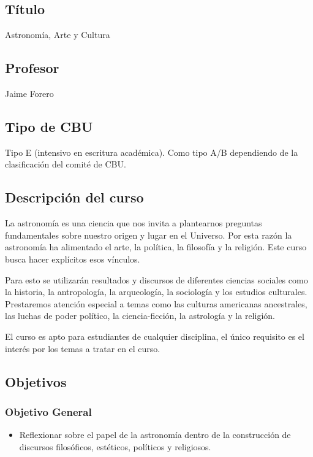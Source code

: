 \documentclass[12pt]{report}
\begin{document}
\subsection*{\bf T\'itulo}
Astronom\'ia, Arte y Cultura\\

\subsection*{\bf Profesor}
Jaime Forero\\

\subsection*{Tipo de CBU}
Tipo E (intensivo en escritura acad\'emica). 
Como tipo A/B dependiendo de la clasificaci\'on del comit\'e de CBU.  

\subsection*{Descripci\'on del curso}
La astronom\'ia es una ciencia que nos invita a plantearnos preguntas
fundamentales sobre nuestro origen y lugar en el Universo. 
Por esta raz\'on la astronom\'ia ha alimentado el
arte, la pol\'itica, la filosof\'ia y la religi\'on. Este curso busca
hacer expl\'icitos esos v\'inculos.

Para esto se utilizar\'an resultados y discursos de diferentes
ciencias sociales como la historia, la antropolog\'ia, la arqueolog\'ia, la
sociolog\'ia y los estudios culturales. Prestaremos atenci\'on
especial a temas como las culturas americanas  ancestrales, las luchas
de poder pol\'itico, la ciencia-ficci\'on, la astrolog\'ia y la
religi\'on.  

El curso es apto para estudiantes de cualquier disciplina, el \'unico
requisito es el inter\'es por los temas a tratar en el curso. 
\subsection*{Objetivos}

\subsubsection*{Objetivo General}
\begin{itemize}
\item Reflexionar sobre el papel de la astronom\'ia dentro de la
  construcci\'on de discursos filos\'oficos,
  est\'eticos, pol\'iticos y religiosos. 
\end{itemize}
\end{document}

